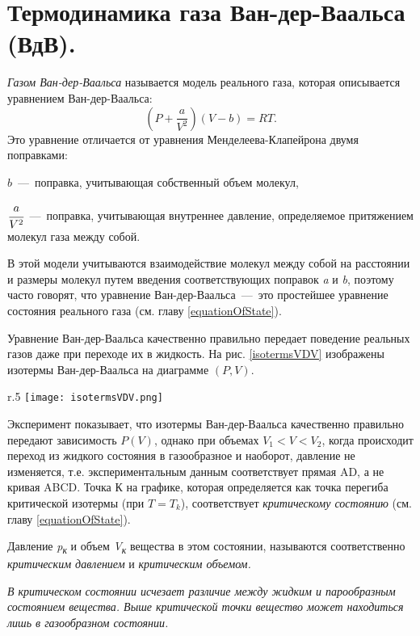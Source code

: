 \chapter{Термодинамика газа Ван-дер-Ваальса (ВдВ).}

\emph{Газом Ван-дер-Ваальса} называется модель реального газа, которая
описывается уравнением Ван-дер-Ваальса:
\begin{equation}
  \left ( P+\frac{a}{V^2}\right )(V-b) = RT.
\end{equation}
Это уравнение отличается от уравнения Менделеева-Клапейрона двумя
поправками:

$b$~---~поправка, учитывающая собственный объем молекул,

$\cfrac{a}{V^2}$~---~поправка, учитывающая внутреннее давление, определяемое притяжением молекул газа между собой.

В этой модели учитываются взаимодействие молекул между собой на расстоянии
и размеры молекул путем введения соответствующих поправок \emph{a} и
\emph{b}, поэтому часто говорят, что уравнение Ван-дер-Ваальса~---~это
простейшее уравнение состояния реального газа (см. главу \ref{equationOfState}).

Уравнение Ван-дер-Ваальса качественно правильно передает поведение
реальных газов даже при переходе их в жидкость. На рис. \ref{isotermsVDV} изображены
изотермы Ван-дер-Ваальса на диаграмме $(P, V)$.
\begin{wrapfigure}{r}{.5\textwidth}
  \centering
  \texttt{[image: isotermsVDV.png]}
  \caption{}
  \label{isotermsVDV}
\end{wrapfigure}
Эксперимент показывает, что изотермы Ван-дер-Ваальса качественно правильно передают зависимость $P(V)$, однако при объемах $V_1 < V < V_2$,
когда происходит переход из жидкого состояния в газообразное и наоборот,
давление не изменяется, т.е. экспериментальным данным соответствует
прямая AD, а не кривая ABCD. Точка К на графике, которая определяется
как точка перегиба критической изотермы (при $T =
T_k$), соответствует \emph{критическому состоянию} (см. главу \ref{equationOfState}).

Давление \emph{p\textsubscript{к}} и объем \emph{V\textsubscript{к}}
вещества в этом состоянии, называются соответственно \emph{критическим
давлением} и \emph{критическим объемом.}

\emph{В критическом состоянии исчезает различие между жидким и
парообразным состоянием вещества. Выше критической точки вещество может
находиться лишь в газообразном состоянии.}

